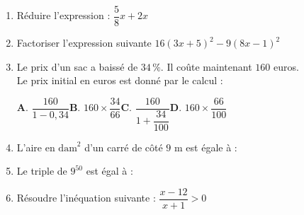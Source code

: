 \documentclass[a4paper,11pt]{article}
\begin{document}
\begin{seanceD}{} %

\begin{enumerate}
\item Réduire l'expression : $\dfrac{5}{8}x+2x$\dotfill

\item Factoriser l'expression suivante  $16(3x+5)^2-9(8x-1)^2$\dotfill

\item  Le prix d'un sac a baissé de $34\,\%$. Il coûte maintenant $160$ euros. \\
    Le prix initial en euros est donné par le calcul :

\medskip
 
    
   	\textbf{A}. $\dfrac{160}{1 - 0{,}34}$\qquad \textbf{B}. $160 \times \dfrac{34}{66}$\qquad \textbf{C}. $\dfrac{160}{1 + \dfrac{34}{100}}$\qquad \textbf{D}. $160 \times \dfrac{66}{100}$\qquad \\



\item  L'aire en $\text{dam}^2$ d'un carré de côté $9$ $\text{m}$ est égale à : \dotfill

\item   Le triple de  $9^{50}$ est égal à : \dotfill

\item Résoudre l'inéquation suivante :  $\dfrac{x-12}{x+1} > 0$
\vspace{6cm}
\end{enumerate}
\end{seanceD}
\end{document}
